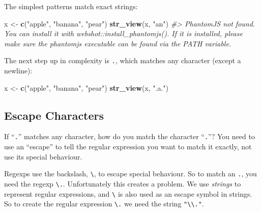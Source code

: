 \documentclass[]{book}
\newenvironment{Shaded}{\begin{snugshade}}{\end{snugshade}}
\newcommand{\CommentTok}[1]{\textcolor[rgb]{0.56,0.35,0.01}{\textit{#1}}}
\newcommand{\KeywordTok}[1]{\textcolor[rgb]{0.13,0.29,0.53}{\textbf{#1}}}
\newcommand{\NormalTok}[1]{#1}
\newcommand{\StringTok}[1]{\textcolor[rgb]{0.31,0.60,0.02}{#1}}
\begin{document}
The simplest patterns match exact strings:

\begin{Shaded}
\begin{Highlighting}[]
\NormalTok{x <-}\StringTok{ }\KeywordTok{c}\NormalTok{(}\StringTok{"apple"}\NormalTok{, }\StringTok{"banana"}\NormalTok{, }\StringTok{"pear"}\NormalTok{)}
\KeywordTok{str_view}\NormalTok{(x, }\StringTok{"an"}\NormalTok{)}
\CommentTok{#> PhantomJS not found. You can install it with webshot::install_phantomjs(). If it is installed, please make sure the phantomjs executable can be found via the PATH variable.}
\end{Highlighting}
\end{Shaded}

\hypertarget{htmlwidget-ac96cb3ee4656e2e9ec3}{}

The next step up in complexity is \texttt{.}, which matches any character (except a newline):

\begin{Shaded}
\begin{Highlighting}[]
\NormalTok{x <-}\StringTok{ }\KeywordTok{c}\NormalTok{(}\StringTok{"apple"}\NormalTok{, }\StringTok{"banana"}\NormalTok{, }\StringTok{"pear"}\NormalTok{)}
\KeywordTok{str_view}\NormalTok{(x, }\StringTok{".a."}\NormalTok{)}
\end{Highlighting}
\end{Shaded}

\hypertarget{htmlwidget-e5c8c404fe174e4c81bd}{}

\hypertarget{escape-characters}{%
\subsection{Escape Characters}\label{escape-characters}}

If ``\texttt{.}'' matches any character, how do you match the character ``\texttt{.}''? You need to use an ``escape'' to tell the regular expression you want to match it exactly, not use its special behaviour.

Regexps use the backslash, \texttt{\textbackslash{}}, to escape special behaviour. So to match an \texttt{.}, you need the regexp \texttt{\textbackslash{}.}. Unfortunately this creates a problem. We use \emph{strings} to represent regular expressions, and \texttt{\textbackslash{}} is also used as an escape symbol in strings. So to create the regular expression \texttt{\textbackslash{}.} we need the string \texttt{"\textbackslash{}\textbackslash{}."}.
\end{document}
